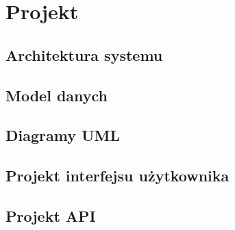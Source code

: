 %


\sloppy

\chapter{Projekt}
\label{rozdzial3}

\section{Architektura systemu}

\section{Model danych}

\section{Diagramy UML}

\section{Projekt interfejsu użytkownika}

\section{Projekt API}
